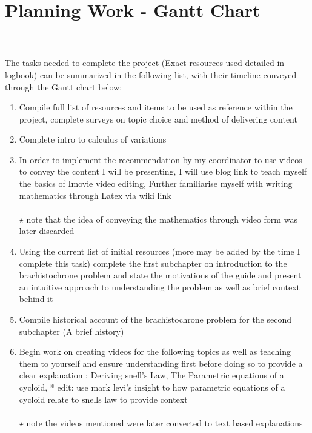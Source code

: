 \documentclass[12pt]{report}
\begin{document}
\chapter{Planning Work - Gantt Chart}
\\
\\
The tasks needed to complete the project (Exact resources used detailed in logbook) can be summarized in the following list, with their timeline conveyed through the Gantt chart below:
\begin{enumerate}
    \item Compile full list of resources and items to be used as reference within the project, complete surveys on topic choice and method of delivering content
    
    \item Complete intro to calculus of variations
    
    \item In order to implement the recommendation by my coordinator to use videos to convey the content I will be presenting, I will use blog link to teach myself the basics of Imovie video editing, Further familiarise myself with writing mathematics through Latex via wiki link
    \\
    \\
    \(\star\) note that the idea of conveying the mathematics through video form was later discarded
    
    \item Using the current list of initial resources (more may be added by the time I complete this task) complete the first subchapter on introduction to the brachistochrone problem and state the motivations of the guide and present an intuitive approach to understanding the problem as well as brief context behind it
    
    \item Compile historical account of the brachistochrone problem for the second subchapter (A brief history)
    
    \item Begin work on creating videos for the following topics as well as teaching them to yourself and ensure understanding first before doing so to provide a clear explanation : Deriving snell’s Law, The Parametric equations of a cycloid, * edit: use mark levi’s insight to how parametric equations of a cycloid relate to snells law to provide context
    \\
    \\
    \(\star\) note the videos mentioned were later converted to text based explanations
    

\end{enumerate}
\end{document}

